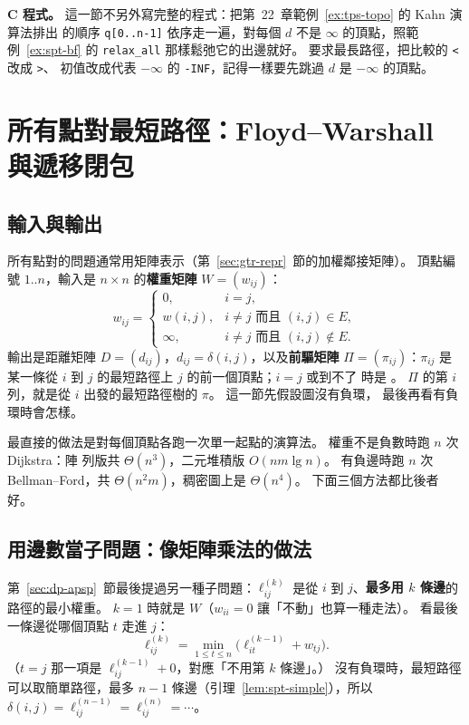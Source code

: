 \textbf{C 程式。} 這一節不另外寫完整的程式：把第~22~章範例~\ref{ex:tps-topo} 的 Kahn 演算法排出
的順序 \texttt{q[0..n-1]} 依序走一遍，對每個 $d$ 不是 $\infty$ 的頂點，照範例~\ref{ex:spt-bf} 的
\texttt{relax\_all} 那樣鬆弛它的出邊就好。 要求最長路徑，把比較的 \texttt{<} 改成 \texttt{>}、
初值改成代表 $-\infty$ 的 \texttt{-INF}，記得一樣要先跳過 $d$ 是 $-\infty$ 的頂點。

\section{所有點對最短路徑：Floyd--Warshall 與遞移閉包}
\label{sec:spt-fw}

\subsection{輸入與輸出}

所有點對的問題通常用矩陣表示（第~\ref{sec:gtr-repr}~節的加權鄰接矩陣）。 頂點編號 $1..n$，輸入是
$n \times n$ 的\textbf{權重矩陣} $W = (w_{ij})$：
\[
w_{ij} = \begin{cases}
0, & i = j, \\
w(i, j), & i \ne j \text{ 而且 } (i, j) \in E, \\
\infty, & i \ne j \text{ 而且 } (i, j) \notin E.
\end{cases}
\]
輸出是距離矩陣 $D = (d_{ij})$，$d_{ij} = \delta(i, j)$，以及\textbf{前驅矩陣} $\Pi =
(\pi_{ij})$：$\pi_{ij}$ 是某一條從 $i$ 到 $j$ 的最短路徑上 $j$ 的前一個頂點；$i = j$ 或到不了
時是 \NIL。 $\Pi$ 的第 $i$ 列，就是從 $i$ 出發的最短路徑樹的 $\pi$。 這一節先假設圖沒有負環，
最後再看有負環時會怎樣。

最直接的做法是對每個頂點各跑一次單一起點的演算法。 權重不是負數時跑 $n$ 次 Dijkstra：陣
列版共 $\Theta(n^3)$，二元堆積版 $O(nm \lg n)$。 有負邊時跑 $n$ 次 Bellman--Ford，共
$\Theta(n^2 m)$，稠密圖上是 $\Theta(n^4)$。 下面三個方法都比後者好。

\subsection{用邊數當子問題：像矩陣乘法的做法}

第~\ref{sec:dp-apsp}~節最後提過另一種子問題：$\ell_{ij}^{(k)}$ 是從 $i$ 到 $j$、\textbf{最多用 $k$
條邊}的路徑的最小權重。 $k = 1$ 時就是 $W$（$w_{ii} = 0$ 讓「不動」也算一種走法）。 看最後
一條邊從哪個頂點 $t$ 走進 $j$：
\[
\ell_{ij}^{(k)} = \min_{1 \le t \le n} \bigl( \ell_{it}^{(k-1)} + w_{tj} \bigr).
\]
（$t = j$ 那一項是 $\ell_{ij}^{(k-1)} + 0$，對應「不用第 $k$ 條邊」。） 沒有負環時，最短路徑
可以取簡單路徑，最多 $n - 1$ 條邊（引理~\ref{lem:spt-simple}），所以 $\delta(i, j) =
\ell_{ij}^{(n-1)} = \ell_{ij}^{(n)} = \cdots$。

